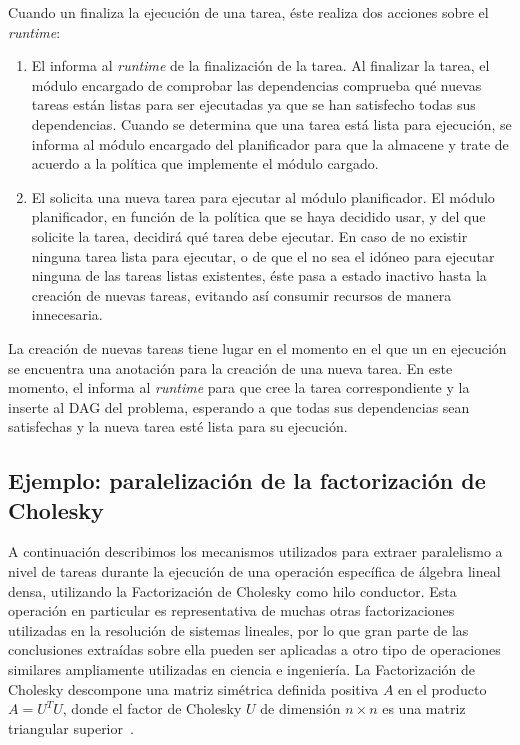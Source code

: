Cuando un \wt finaliza la ejecución de una tarea, éste realiza dos acciones
sobre el \emph{runtime}:
\begin{enumerate}
\item El \wt informa al \emph{runtime} de la finalización de la tarea. Al
  finalizar la tarea, el módulo encargado de comprobar las dependencias
  comprueba qué nuevas tareas están listas para ser ejecutadas ya que se
  han satisfecho todas sus dependencias. Cuando se determina que una tarea
  está lista para ejecución, se informa al módulo encargado del
  planificador para que la almacene y trate de acuerdo a la política que
  implemente el módulo cargado.
\item El \wt solicita una nueva tarea para ejecutar al módulo
  planificador. El módulo planificador, en función de la política que se
  haya decidido usar, y del \wt que solicite la tarea, decidirá qué tarea
  debe ejecutar. En caso de no existir ninguna tarea lista para ejecutar, o
  de que el \wt no sea el idóneo para ejecutar ninguna de las tareas listas
  existentes, éste pasa a estado inactivo hasta la creación de nuevas
  tareas, evitando así consumir recursos de manera innecesaria.
\end{enumerate}

La creación de nuevas tareas tiene lugar en el momento en el que un \wt en
ejecución se encuentra una anotación para la creación de una nueva
tarea. En este momento, el \wt informa al \emph{runtime} para que cree la
tarea correspondiente y la inserte al DAG del problema, esperando a que
todas sus dependencias sean satisfechas y la nueva tarea esté lista para su
ejecución.



\subsection{Ejemplo: paralelización de la factorización de Cholesky}

A continuación describimos los mecanismos utilizados para extraer
paralelismo a nivel de tareas durante la ejecución de una operación
específica de álgebra lineal densa, utilizando la Factorización de Cholesky
como hilo conductor. Esta operación en particular es representativa de
muchas otras factorizaciones utilizadas en la resolución de sistemas
lineales, por lo que gran parte de las conclusiones extraídas sobre ella
pueden ser aplicadas a otro tipo de operaciones similares ampliamente
utilizadas en ciencia e ingeniería.
%
La Factorización de Cholesky descompone una matriz simétrica definida positiva
$A$ en el producto $A=U^TU$, donde el factor de Cholesky $U$ de dimensión $n \times n$ es una matriz triangular
superior~\cite{GVL3}. 

